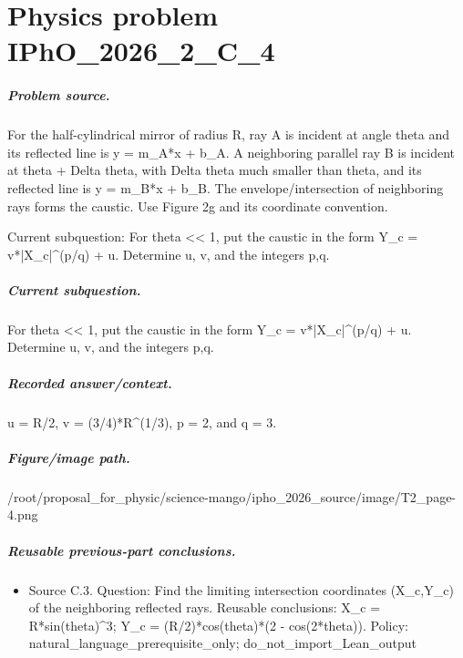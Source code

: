 
\chapter{Physics problem IPhO\_2026\_2\_C\_4}
\label{ch:IPhO2026Problems_problem_IPhO_2026_2_C_4}

\paragraph{Problem source.}
For the half-cylindrical mirror of radius R, ray A is incident at angle theta
and its reflected line is y = m\_A*x + b\_A.  A neighboring parallel ray B is
incident at theta + Delta theta, with Delta theta much smaller than theta, and
its reflected line is y = m\_B*x + b\_B.  The envelope/intersection of neighboring
rays forms the caustic.  Use Figure 2g and its coordinate convention.

Current subquestion:
For theta << 1, put the caustic in the form Y\_c = v*|X\_c|\textasciicircum{}(p/q) + u. Determine u, v, and the integers p,q.

\paragraph{Current subquestion.}
For theta << 1, put the caustic in the form Y\_c = v*|X\_c|\textasciicircum{}(p/q) + u. Determine u, v, and the integers p,q.

\paragraph{Recorded answer/context.}
u = R/2, v = (3/4)*R\textasciicircum{}(1/3), p = 2, and q = 3.

\paragraph{Figure/image path.}
/root/proposal\_for\_physic/science-mango/ipho\_2026\_source/image/T2\_page-4.png

\paragraph{Reusable previous-part conclusions.}
\begin{itemize}
\item Source C.3. Question: Find the limiting intersection coordinates (X\_c,Y\_c) of the neighboring reflected rays. Reusable conclusions: X\_c = R*sin(theta)\textasciicircum{}3; Y\_c = (R/2)*cos(theta)*(2 - cos(2*theta)). Policy: natural\_language\_prerequisite\_only; do\_not\_import\_Lean\_output
\end{itemize}

